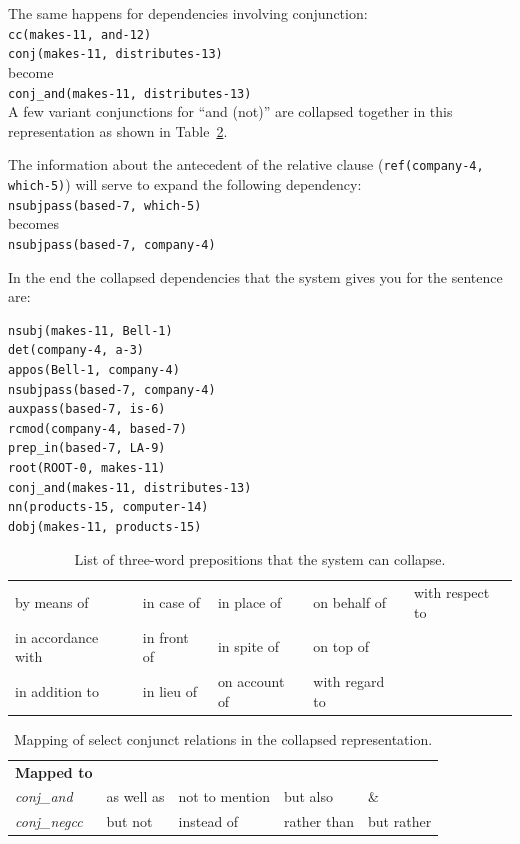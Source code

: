 \documentclass[11pt,letter]{article}
\begin{document}
\bigskip

\noindent The same happens for dependencies involving conjunction:\\
\indent \texttt{cc(makes-11, and-12)}\\
\indent \texttt{conj(makes-11, distributes-13)}\\
become\\
\indent \texttt{conj\_and(makes-11, distributes-13)}\\
A few variant conjunctions for ``and (not)'' are collapsed together in this representation as shown in Table~\ref{conjand}.

\bigskip

\noindent The information about the antecedent of the relative clause (\texttt{ref(company-4, which-5)}) will serve to expand the following dependency:\\
\indent \texttt{nsubjpass(based-7, which-5)}\\
becomes\\
\indent \texttt{nsubjpass(based-7, company-4)}

\bigskip

\noindent In the end the collapsed dependencies that the system gives you for the sentence are:
\begin{verbatim}
nsubj(makes-11, Bell-1)
det(company-4, a-3)
appos(Bell-1, company-4)
nsubjpass(based-7, company-4)
auxpass(based-7, is-6)
rcmod(company-4, based-7)
prep_in(based-7, LA-9)
root(ROOT-0, makes-11)
conj_and(makes-11, distributes-13)
nn(products-15, computer-14)
dobj(makes-11, products-15)
\end{verbatim}

\begin{table}
\begin{center}
\begin{tabular}{lllll}\hline
by means of & in case of & in place of & on behalf of & with respect to\\
in accordance with & in front of & in spite of & on top of & \\
in addition to & in lieu of & on account of & with regard to &\\
 \hline
\end{tabular}
\caption{List of three-word prepositions that the system can collapse.}\label{3wp}
\end{center}
\end{table}

\begin{table}
\begin{center}
\begin{tabular}{lllll}\hline
\textbf{Mapped to} & \\
\emph{conj\_and} & as well as & not to mention & but also & \& \\
\emph{conj\_negcc} & but not & instead of & rather than & but rather \\
\hline
\end{tabular}
\caption{Mapping of select conjunct relations in the collapsed representation.}\label{conjand}
\end{center}
\end{table}
\end{document}
